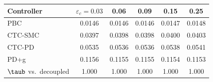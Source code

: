 \begin{tabular}{lccccc}
\toprule
Controller & $\varepsilon_{c} = 0.03$ & 0.06 & 0.09 & 0.15 & 0.25 \\
\midrule
PBC     & 0.0146 & 0.0146 & 0.0146 & 0.0147 & 0.0148 \\
CTC-SMC & 0.0397 & 0.0398 & 0.0398 & 0.0400 & 0.0403 \\
CTC-PD  & 0.0535 & 0.0536 & 0.0536 & 0.0538 & 0.0541 \\
PD+g    & 0.1156 & 0.1155 & 0.1155 & 0.1154 & 0.1153 \\
\midrule
$\taub$ vs.\ decoupled & 1.000 & 1.000 & 1.000 & 1.000 & 1.000 \\
\bottomrule
\end{tabular}
